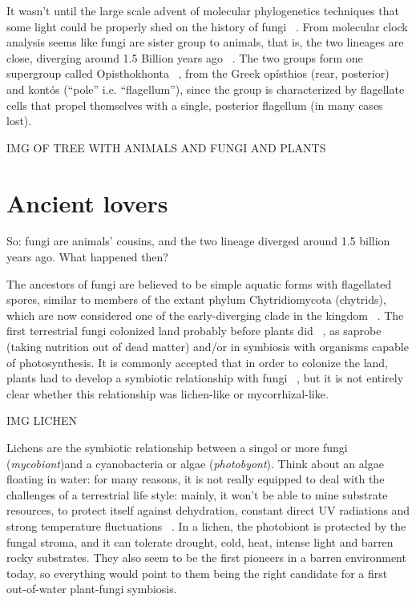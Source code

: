 It wasn't until the large scale advent of molecular phylogenetics techniques that some light could be properly shed on the history of fungi ~\citep{james2006}.
From molecular clock analysis seems like fungi are sister group to animals, that is, the two lineages are close, diverging around 1.5 Billion years ago ~\citep{wang1999}. The two groups form one supergroup called Opisthokhonta ~\citep{cavalier-smith1987}, from the Greek opísthios (rear, posterior) and kontós (``pole'' i.e. ``flagellum''), since the group is characterized by flagellate cells that propel themselves with a single, posterior flagellum (in many cases lost).

IMG OF TREE WITH ANIMALS AND FUNGI AND PLANTS

\chapter{Ancient lovers}
\label{ancientlovers}

So: fungi are animals' cousins, and the two lineage diverged around 1.5 billion years ago. What happened then?

The ancestors of fungi are believed to be simple aquatic forms with flagellated spores, similar to members of the extant phylum Chytridiomycota (chytrids), which are now considered one of the early-diverging clade in the kingdom ~\citep{james2006}. The first terrestrial fungi colonized land probably before plants did ~\citep{heckman2001}, as saprobe (taking nutrition out of dead matter) and\slash or in symbiosis with organisms capable of photosynthesis.
It is commonly accepted that in order to colonize the land, plants had to develop a symbiotic relationship with fungi ~\citep{selosse1998, heckman2001, bonneville2020}, but it is not entirely clear whether this relationship was lichen-like or mycorrhizal-like.

IMG LICHEN

Lichens are the symbiotic relationship between a singol or more fungi (\emph{mycobiont})and a cyanobacteria or algae (\emph{photobyont}). Think about an algae floating in water: for many reasons, it is not really equipped to deal with the challenges of a terrestrial life style: mainly, it won't be able to mine substrate resources, to protect itself against dehydration, constant direct UV radiations and strong temperature fluctuations ~\citep{selosse1998, blackwell2000}. In a lichen, the photobiont is protected by the fungal stroma, and it can tolerate drought, cold, heat, intense light and barren rocky substrates. They also seem to be the first pioneers in a barren environment today, so everything would point to them being the right candidate for a first out-of-water plant-fungi symbiosis.

